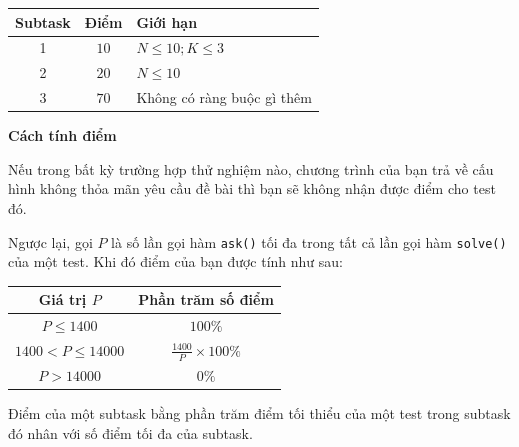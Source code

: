 \begin{center}
  \begin{tabular}{|c|c|l|} \hline
    \textbf{Subtask} & \textbf{Điểm} & \textbf{Giới hạn} \\ \hline
    1 & $10$ & $N\le 10;K\le 3$ \\ \hline
    2 & $20$ & $N\le 10$ \\ \hline
    3 & $70$ & Không có ràng buộc gì thêm \\ \hline
  \end{tabular}
\end{center}

\textbf{Cách tính điểm}

Nếu trong bất kỳ trường hợp thử nghiệm nào, chương trình của bạn trả về cấu hình không thỏa mãn yêu cầu đề bài thì bạn sẽ không nhận được điểm cho test đó.

Ngược lại, gọi $P$ là số lần gọi hàm \texttt{ask()} tối đa trong tất cả lần gọi hàm \texttt{solve()} của một test. Khi đó điểm của bạn được tính như sau:

\begin{center}
  \begin{tabular}{|c|c|} \hline
    \textbf{Giá trị $P$} & \textbf{Phần trăm số điểm} \\ \hline
    $P \le 1400$ & $100\%$ \\ \hline
    $1400 \lt P \le 14000$ & $\frac{1400}P\times 100\%$ \\ \hline
    $P \gt 14000$ & $0\%$ \\ \hline
  \end{tabular}
\end{center}

Điểm của một subtask bằng phần trăm điểm tối thiểu của một test trong subtask đó nhân với số điểm tối đa của subtask.